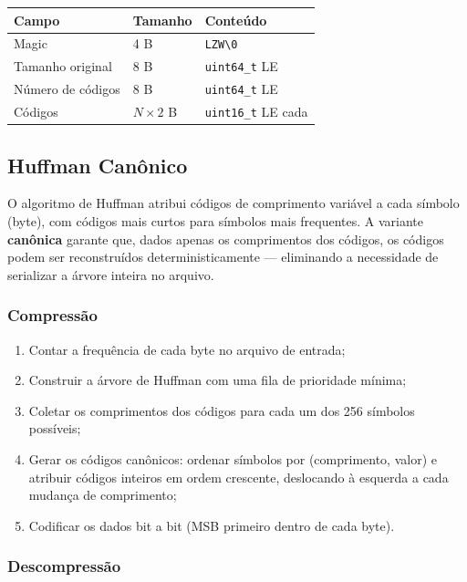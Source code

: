 \documentclass{ifpr-pinhais}
\begin{document}
\begin{center}
\begin{tabular}{lll}
\toprule
Campo & Tamanho & Conteúdo \\
\midrule
Magic & 4 B & \texttt{LZW\textbackslash 0} \\
Tamanho original & 8 B & \texttt{uint64\_t} LE \\
Número de códigos & 8 B & \texttt{uint64\_t} LE \\
Códigos & $N \times 2$ B & \texttt{uint16\_t} LE cada \\
\bottomrule
\end{tabular}
\end{center}

\subsection{Huffman Canônico}

O algoritmo de Huffman atribui códigos de comprimento variável a cada símbolo (byte), com códigos mais curtos para símbolos mais frequentes. A variante \textbf{canônica} garante que, dados apenas os comprimentos dos códigos, os códigos podem ser reconstruídos deterministicamente --- eliminando a necessidade de serializar a árvore inteira no arquivo.

\subsubsection{Compressão}

\begin{enumerate}
    \item Contar a frequência de cada byte no arquivo de entrada;
    \item Construir a árvore de Huffman com uma fila de prioridade mínima;
    \item Coletar os comprimentos dos códigos para cada um dos 256 símbolos possíveis;
    \item Gerar os códigos canônicos: ordenar símbolos por (comprimento, valor) e atribuir códigos inteiros em ordem crescente, deslocando à esquerda a cada mudança de comprimento;
    \item Codificar os dados bit a bit (MSB primeiro dentro de cada byte).
\end{enumerate}

\subsubsection{Descompressão}
\end{document}
